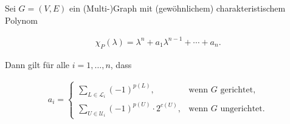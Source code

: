             \begin{theorem} \label{thm:characteristic_coefficints}

                Sei $G = (V, E)$ ein (Multi-)Graph mit (gewöhnlichem) charakteristischem Polynom
    
                \begin{align*}
                    \chi_P(\lambda)
                    =
                    \lambda^n + a_1 \lambda^{n-1} + \cdots + a_n.
                \end{align*}
    
                Dann gilt für alle $i = 1, \dots, n$, dass
    
                \begin{align} \label{eq:characteristic_coefficints}
                    a_i
                    =
                    \begin{cases}
                        \sum_{L \in \mathcal L_i} (-1)^{p(L)},
                        & \text{wenn $G$ gerichtet}, \\
                        \sum_{U \in \mathcal U_i} (-1)^{p(U)} \cdot 2^{c(U)},
                        & \text{wenn $G$ ungerichtet}.
                    \end{cases}
                \end{align}    
    
            \end{theorem}
    
